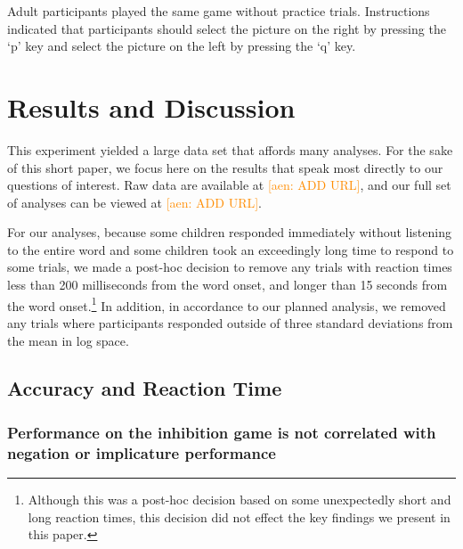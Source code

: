 \documentclass[10pt,letterpaper]{article}
\newcommand{\aen}[1]{\textcolor{DarkOrange}{[aen: #1]}}
\begin{document}
Adult participants played the same game without practice trials.  Instructions indicated that participants should select the picture on the right by pressing the `p' key and select the picture on the left by pressing the `q' key.  

\section{Results and Discussion}

This experiment yielded a large data set that affords many analyses.  For the sake of this short paper, we focus here on the results that speak most directly to our questions of interest.  Raw data are available at \aen{ADD URL}, and our full set of analyses can be viewed at \aen{ADD URL}.  

For our analyses, because some children responded immediately without listening to the entire word and some children took an exceedingly long time to respond to some trials, we made a post-hoc decision to remove any trials with reaction times less than 200 milliseconds from the word onset, and longer than 15 seconds from the word onset.\footnote{Although this was a post-hoc decision based on some unexpectedly short and long reaction times, this decision did not effect the key findings we present in this paper.}  In addition, in accordance to our planned analysis, we removed any trials where participants responded outside of three standard deviations from the mean in log space.

\subsection{Accuracy and Reaction Time}

\subsubsection{Performance on the inhibition game is not correlated with negation or implicature performance}
\end{document}
